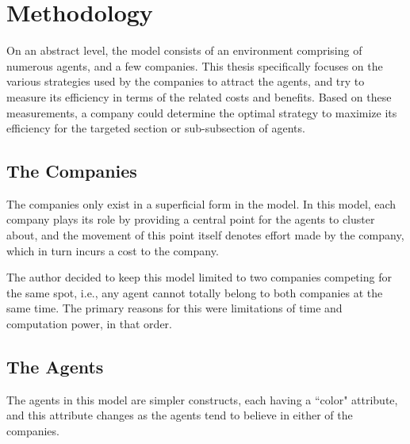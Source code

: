 
\chapter{Methodology} %

\label{Chapter3} %


On an abstract level, the model consists of an environment comprising of numerous agents, and a few companies. This thesis specifically focuses on the various strategies used by the companies to attract the agents, and try to measure its efficiency in terms of the related costs and benefits. Based on these measurements, a company could determine the optimal strategy to maximize its efficiency for the targeted section or sub-subsection of agents.


\section{The Companies}

The companies only exist in a superficial form in the model. In this model, each company plays its role by providing a central point for the agents to cluster about, and the movement of this point itself denotes effort made by the company, which in turn incurs a cost to the company.

The author decided to keep this model limited to two companies competing for the same spot, i.e., any agent cannot totally belong to both companies at the same time. 
The primary reasons for this were limitations of time and computation power, in that order.


\section{The Agents}

The agents in this model are simpler constructs, each  having a ``color" attribute, and this attribute changes as the agents tend to believe in either of the companies.

